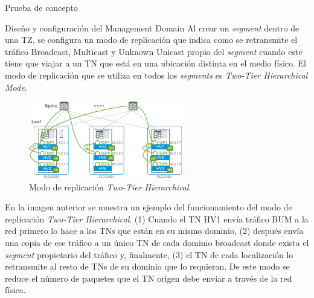 \begin{section}{Prueba de concepto}
\begin{subsection}{Diseño y configuración del Management Domain}
    Al crear un \textit{segment} dentro de una TZ, se configura un modo de replicación que indica como se retransmite el tráfico Broadcast, Multicast y Unknown Unicast propio del \textit{segment} cuando este tiene que viajar a un TN que está en una ubicación distinta en el medio físico. El modo de replicación que se utiliza en todos los \textit{segments} es \textit{Two-Tier Hierarchical Mode}. 
    \begin{figure}[h]
      \centering
      \includegraphics[width=0.6\textwidth]{imaxes/pruebaconcepto/Two-tier-ReplicationMode.png}
      \caption{Modo de replicación \textit{Two-Tier Hierarchical}.}
      \label{fig:Frame-Geneve-Segment-NSXT}
    \end{figure}
    \FloatBarrier
    En la imagen anterior se muestra un ejemplo del funcionamiento del modo de replicación \textit{Two-Tier Hierarchical}. (1) Cuando el TN HV1 envía tráfico BUM a la red primero lo hace a los TNs que están en su mismo dominio, (2) después envía una copia de ese tráfico a un único TN de cada dominio broadcast donde exista el \textit{segment} propietario del tráfico y, finalmente, (3) el TN de cada localización lo retransmite al resto de TNs de su dominio que lo requieran. De este modo se reduce el número de paquetes que el TN origen debe enviar a través de la red física.
    

\end{subsection}
\end{section}
